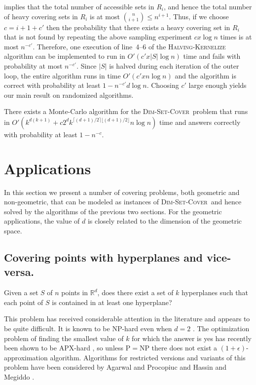 \documentclass[ccfonts,lotsofwhite]{patmorin}
\newcommand{\setcover}{\textsc{Dim-Set-Cover}}
\newcommand{\exponent}{\lceil(d+1)/2\rceil\lfloor(d+1)/2\rfloor}
\newcommand{\runtime}{k^{d(k+1)}+c2^dk^{\exponent}n\log n}
\begin{document}
{ implies that the total number of accessible sets in
$R_i$, and hence the total number of heavy covering sets in $R_i$ is
at most ${n\choose i+1}\le n^{i+1}$.  Thus, if we choose $c={i+1+c'}$
then the probability that there exists a heavy covering set in $R_i$
that is not found by repeating the above sampling experiment $cx\log
n$ times is at most $n^{-c'}$.  Therefore, one execution of line~4--6
of the \textsc{Halving-Kernelize} algorithm can be implemented to run
in $O'(c'x|S|\log n)$ time and fails with probability at most
$n^{-c'}$.  Since $|S|$ is halved during each iteration of the outer
loop, the entire algorithm runs in time $O'(c'xn\log n)$ and the
algorithm is correct with probability at least $1-n^{-c'}d\log n$.
Choosing $c'$ large enough yields our main result on randomized
algorithms.

\begin{thm}
There exists a Monte-Carlo algorithm for the \setcover\ problem that
runs in $O'(\runtime)$ time and answers
correctly with probability at least $1-n^{-c}$.
\end{thm}
}

\section{Applications}

In this section we present a number of covering problems, both
geometric and non-geometric, that can be modeled as instances of
\setcover\ and hence solved by the algorithms of the previous two
sections.  For the geometric applications, the value of $d$ is closely
related to the dimension of the geometric space.

\subsection{Covering points with hyperplanes and vice-versa.}

Given a set $S$ of $n$ points in $\mathbb{R}^d$, does there exist a
set of $k$ hyperplanes such that each point of $S$ is contained in at
least one hyperplane?

This problem has received considerable attention in the literature and
appears to be quite difficult.  It is known to be NP-hard even when
$d=2$ \cite{mt82}.  The optimization problem of finding the smallest
value of $k$ for which the answer is yes has recently been shown to be
APX-hard \cite{bhn01,kar00}, so unless $\mathrm{P}=\mathrm{NP}$
there does not exist a $(1+\epsilon)$-approximation algorithm.
Algorithms for restricted versions and variants of this problem have
been considered by \mbox{Agarwal} and \mbox{Procopiuc} \cite{ap98} and
\mbox{Hassin} and \mbox{Megiddo} \cite{hm91}.
\end{document}
